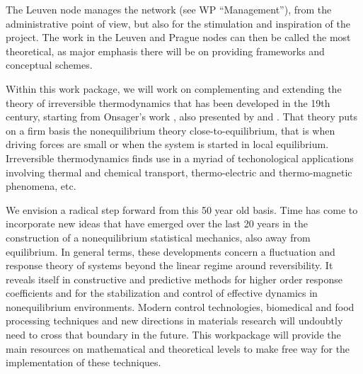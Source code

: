\begin{workpackage}[id=WPcore,wphases=0-48,
  short=Gen. Theory, %
  title=General Theory, %
  lead=KUL,
  KULRM=36]

\begin{wpobjectives}

\end{wpobjectives}

\begin{wpdescription}

The Leuven node manages the network (see WP ``Management''), from the administrative point
of view, but also for the stimulation and inspiration of the project. The work in the Leuven
and Prague nodes can then be called the most theoretical, as major emphasis there will be on
providing frameworks and conceptual schemes.

Within this work package, we will work on complementing and extending the theory of
irreversible thermodynamics that has been developed in the 19th century, starting from
Onsager's work \cite{onsager1,onsager2}, also presented by \cite{degrootmazur} and \cite{kubo}.
%
That theory puts on a firm basis the nonequilibrium theory close-to-equilibrium, that is
when driving forces are small or when the system is started in local equilibrium.
%
Irreversible thermodynamics finds use in a myriad of techonological applications involving
thermal and chemical transport, thermo-electric and thermo-magnetic phenomena, etc.

We envision a radical step forward from this 50 year old basis. Time has come to incorporate
new ideas that have emerged over the last 20 years in the construction of a nonequilibrium
statistical mechanics, also away from equilibrium.
%
In general terms, these developments concern a fluctuation and response theory of systems
beyond the linear regime around reversibility. It reveals itself in constructive and
predictive methods for higher order response coefficients and for the stabilization and
control of effective dynamics in nonequilibrium environments.
%
Modern control technologies, biomedical and food processing techniques and new directions in
materials research will undoubtly need to cross that boundary in the future. This
workpackage will provide the main resources on mathematical and theoretical levels to make
free way for the implementation of these techniques.

\printbibliography[heading=proposal-bib,env=proposal-env]


\end{wpdescription}
\end{workpackage}
